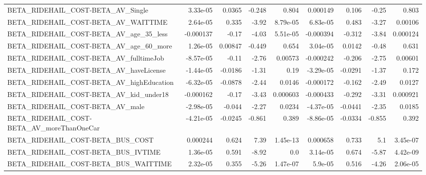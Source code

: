\begin{tabular}{lrrrrrrrr}
BETA\_RIDEHAIL\_COST-BETA\_AV\_Single                  &    3.33e-05 &       0.0365 &   -0.248 &    0.804 &   0.000149 &       0.106 &        -0.25 &         0.803 \\
BETA\_RIDEHAIL\_COST-BETA\_AV\_WAITTIME                &    2.64e-05 &        0.335 &    -3.92 & 8.79e-05 &   6.83e-05 &       0.483 &        -3.27 &       0.00106 \\
BETA\_RIDEHAIL\_COST-BETA\_AV\_age\_35\_less             &   -0.000137 &        -0.17 &    -4.03 & 5.51e-05 &  -0.000394 &      -0.312 &        -3.84 &      0.000124 \\
BETA\_RIDEHAIL\_COST-BETA\_AV\_age\_60\_more             &    1.26e-05 &      0.00847 &   -0.449 &    0.654 &   3.04e-05 &      0.0142 &        -0.48 &         0.631 \\
BETA\_RIDEHAIL\_COST-BETA\_AV\_fulltimeJob             &   -8.57e-05 &        -0.11 &    -2.76 &  0.00573 &  -0.000242 &      -0.206 &        -2.75 &       0.00601 \\
BETA\_RIDEHAIL\_COST-BETA\_AV\_haveLicense             &   -1.44e-05 &      -0.0186 &    -1.31 &     0.19 &  -3.29e-05 &     -0.0291 &        -1.37 &         0.172 \\
BETA\_RIDEHAIL\_COST-BETA\_AV\_highEducation           &   -6.32e-05 &      -0.0878 &    -2.44 &   0.0146 &  -0.000172 &      -0.162 &        -2.49 &        0.0127 \\
BETA\_RIDEHAIL\_COST-BETA\_AV\_kid\_under18             &   -0.000162 &        -0.17 &    -3.43 & 0.000603 &  -0.000433 &      -0.292 &        -3.31 &      0.000921 \\
BETA\_RIDEHAIL\_COST-BETA\_AV\_male                    &   -2.98e-05 &       -0.044 &    -2.27 &   0.0234 &  -4.37e-05 &     -0.0441 &        -2.35 &        0.0185 \\
BETA\_RIDEHAIL\_COST-BETA\_AV\_moreThanOneCar          &   -4.21e-05 &      -0.0245 &   -0.861 &    0.389 &  -8.86e-05 &     -0.0334 &       -0.855 &         0.392 \\
BETA\_RIDEHAIL\_COST-BETA\_BUS\_COST                   &    0.000244 &        0.624 &     7.39 & 1.45e-13 &   0.000658 &       0.733 &          5.1 &      3.45e-07 \\
BETA\_RIDEHAIL\_COST-BETA\_BUS\_IVTIME                 &    1.36e-05 &        0.591 &    -8.92 &      0.0 &   3.14e-05 &       0.674 &        -5.87 &      4.42e-09 \\
BETA\_RIDEHAIL\_COST-BETA\_BUS\_WAITTIME               &    2.32e-05 &        0.355 &    -5.26 & 1.47e-07 &    5.9e-05 &       0.516 &        -4.26 &      2.06e-05 \\

\end{tabular}
